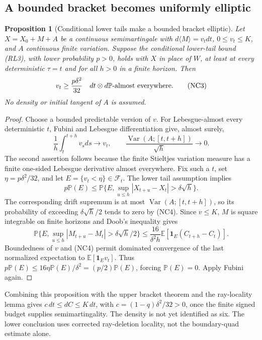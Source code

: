 \documentclass[11pt]{article}
\newtheorem{proposition}[theorem]{Proposition}
\theoremstyle{definition}\newtheorem{definition}[theorem]{Definition}
\theoremstyle{remark}\newtheorem{remark}[theorem]{Remark}
\begin{document}
\subsection{A bounded bracket becomes uniformly elliptic}
\label{sec:lower-bracket-from-locality}

\begin{proposition}[Conditional lower tails make a bounded bracket elliptic]
\label{prop:bracket-lower-tail}
Let $X=X_0+M+A$ be a continuous semimartingale with
$d\langle M\rangle=v_tdt$, $0\le v_t\le K$, and $A$ continuous finite
variation. Suppose the conditional lower-tail bound (RL3), with lower probability
$p>0$, holds with $X$ in place of $W$, at least at
every deterministic $\tau=t$ and for all $h>0$ in a finite horizon.
Then
\[
 v_t\ge \frac{p\delta^2}{32}
       \quad dt\otimes d\mathbb P\hbox{-almost everywhere}.
 \tag{NC3}
\]
No density or initial tangent of $A$ is assumed.
\end{proposition}
\begin{proof}
Choose a bounded predictable version of $v$. For Lebesgue-almost every
deterministic $t$, Fubini and Lebesgue differentiation give, almost surely,
\[
 \frac1h\int_t^{t+h}v_sds\longrightarrow v_t,
 \qquad
 \frac{\operatorname{Var}(A;[t,t+h])}{\sqrt h}\longrightarrow0.
 \tag{NC4}
\]
The second assertion follows because the finite Stieltjes variation
measure has a finite one-sided Lebesgue derivative almost everywhere.
Fix such a $t$, set $\eta=p\delta^2/32$, and let
$E=\{v_t<\eta\}\in\mathcal F_t$. The lower tail assumption implies
\[
 p\mathbb P(E)\le
 \mathbb P\{E,\sup_{u\le h}|X_{t+u}-X_t|>\delta\sqrt h\}.
\]
The corresponding drift supremum is at most
$\operatorname{Var}(A;[t,t+h])$, so its probability of exceeding
$\delta\sqrt h/2$ tends to zero by (NC4). Since $v\le K$, $M$ is
square integrable on finite horizons and Doob's inequality gives
\[
 \mathbb P\{E,\sup_{u\le h}|M_{t+u}-M_t|>\delta\sqrt h/2\}
 \le\frac{16}{\delta^2h}
       \mathbb E[\mathbf1_E(C_{t+h}-C_t)].
\]
Boundedness of $v$ and (NC4) permit dominated convergence of the last
normalized expectation to $\mathbb E[\mathbf1_Ev_t]$.
Thus $p\mathbb P(E)\le16\eta\mathbb P(E)/\delta^2
=(p/2)\mathbb P(E)$, forcing $\mathbb P(E)=0$. Apply Fubini again.
\end{proof}

Combining this proposition with the upper bracket theorem and the
ray-locality lemma gives $c\,dt\le dC\le K\,dt$, with
$c=(1-q)\delta^2/32>0$, once the finite signed budget supplies
semimartingality. The density is not yet identified as six. The lower
conclusion uses corrected ray-deletion locality, not the boundary-quad
estimate alone.
\end{document}
